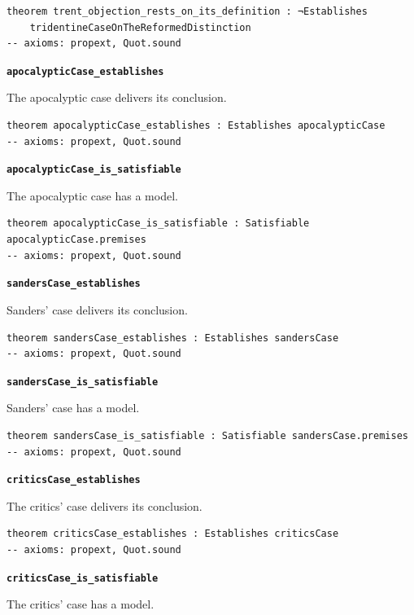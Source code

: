\documentclass[11pt]{article}
\begin{document}
{\small\begin{verbatim}
theorem trent_objection_rests_on_its_definition : ¬Establishes
    tridentineCaseOnTheReformedDistinction
-- axioms: propext, Quot.sound
\end{verbatim}}
\par\medskip\noindent\textbf{\texttt{apocalyptic\allowbreak{}Case\_\allowbreak{}establishes}}\par\nobreak\noindent
The apocalyptic case delivers its conclusion.

{\small\begin{verbatim}
theorem apocalypticCase_establishes : Establishes apocalypticCase
-- axioms: propext, Quot.sound
\end{verbatim}}
\par\medskip\noindent\textbf{\texttt{apocalyptic\allowbreak{}Case\_\allowbreak{}is\_\allowbreak{}satisfiable}}\par\nobreak\noindent
The apocalyptic case has a model.

{\small\begin{verbatim}
theorem apocalypticCase_is_satisfiable : Satisfiable apocalypticCase.premises
-- axioms: propext, Quot.sound
\end{verbatim}}
\par\medskip\noindent\textbf{\texttt{sanders\allowbreak{}Case\_\allowbreak{}establishes}}\par\nobreak\noindent
Sanders' case delivers its conclusion.

{\small\begin{verbatim}
theorem sandersCase_establishes : Establishes sandersCase
-- axioms: propext, Quot.sound
\end{verbatim}}
\par\medskip\noindent\textbf{\texttt{sanders\allowbreak{}Case\_\allowbreak{}is\_\allowbreak{}satisfiable}}\par\nobreak\noindent
Sanders' case has a model.

{\small\begin{verbatim}
theorem sandersCase_is_satisfiable : Satisfiable sandersCase.premises
-- axioms: propext, Quot.sound
\end{verbatim}}
\par\medskip\noindent\textbf{\texttt{critics\allowbreak{}Case\_\allowbreak{}establishes}}\par\nobreak\noindent
The critics' case delivers its conclusion.

{\small\begin{verbatim}
theorem criticsCase_establishes : Establishes criticsCase
-- axioms: propext, Quot.sound
\end{verbatim}}
\par\medskip\noindent\textbf{\texttt{critics\allowbreak{}Case\_\allowbreak{}is\_\allowbreak{}satisfiable}}\par\nobreak\noindent
The critics' case has a model.
\end{document}
